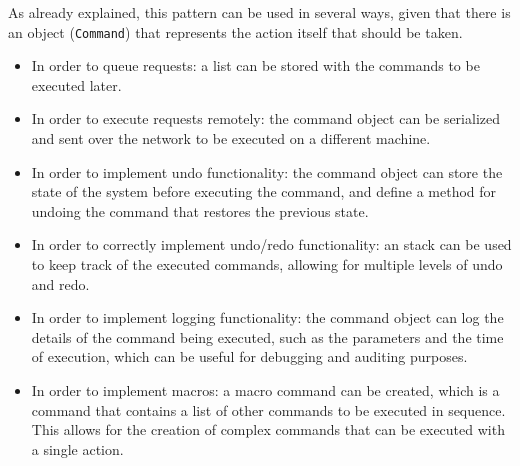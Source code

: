 As already explained, this pattern can be used in several ways, given that there is an object (\texttt{Command}) that represents the action itself that should be taken.
\begin{itemize}
    \item In order to queue requests: a list can be stored with the commands to be executed later.
    \item In order to execute requests remotely: the command object can be serialized and sent over the network to be executed on a different machine.
    \item In order to implement undo functionality: the command object can store the state of the system before executing the command, and define a method for undoing the command that restores the previous state.
    \item In order to correctly implement undo/redo functionality: an stack can be used to keep track of the executed commands, allowing for multiple levels of undo and redo.
    \item In order to implement logging functionality: the command object can log the details of the command being executed, such as the parameters and the time of execution, which can be useful for debugging and auditing purposes.
    \item In order to implement macros: a macro command can be created, which is a command that contains a list of other commands to be executed in sequence. This allows for the creation of complex commands that can be executed with a single action.
\end{itemize}


